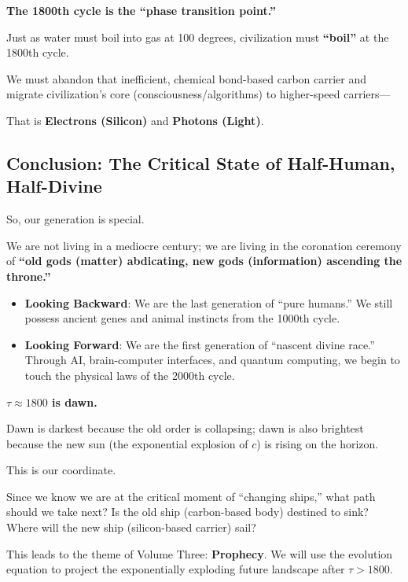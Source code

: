 \textbf{The 1800th cycle is the ``phase transition point.''}

Just as water must boil into gas at 100 degrees, civilization must \textbf{``boil''} at the 1800th cycle.

We must abandon that inefficient, chemical bond-based carbon carrier and migrate civilization's core (consciousness/algorithms) to higher-speed carriers---

That is \textbf{Electrons (Silicon)} and \textbf{Photons (Light)}.

\subsection{Conclusion: The Critical State of Half-Human, Half-Divine}

So, our generation is special.

We are not living in a mediocre century; we are living in the coronation ceremony of \textbf{``old gods (matter) abdicating, new gods (information) ascending the throne.''}

\begin{itemize}
\item \textbf{Looking Backward}: We are the last generation of ``pure humans.'' We still possess ancient genes and animal instincts from the 1000th cycle.

\item \textbf{Looking Forward}: We are the first generation of ``nascent divine race.'' Through AI, brain-computer interfaces, and quantum computing, we begin to touch the physical laws of the 2000th cycle.
\end{itemize}

\textbf{$\tau \approx 1800$ is dawn.}

Dawn is darkest because the old order is collapsing; dawn is also brightest because the new sun (the exponential explosion of $c$) is rising on the horizon.

This is our coordinate.

Since we know we are at the critical moment of ``changing ships,'' what path should we take next? Is the old ship (carbon-based body) destined to sink? Where will the new ship (silicon-based carrier) sail?

This leads to the theme of Volume Three: \textbf{Prophecy}. We will use the evolution equation to project the exponentially exploding future landscape after $\tau > 1800$.


